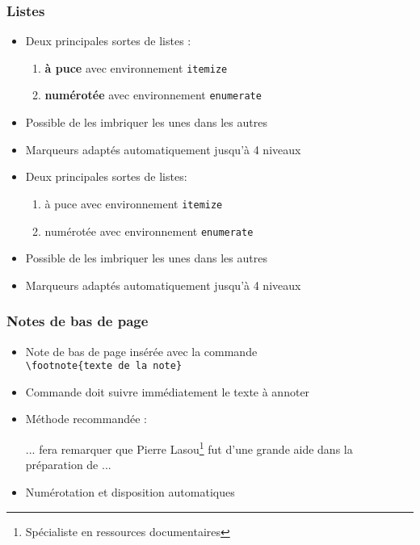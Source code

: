 \begin{frame}[fragile]

	\frametitle{Listes}
	
	\begin{itemize}
		\item Deux principales sortes de listes :
		\begin{enumerate}
			\item \textbf{à puce} avec environnement \texttt{itemize}
			\item \textbf{numérotée} avec environnement \texttt{enumerate}
		\end{enumerate}
		\item Possible de les imbriquer les unes dans les autres
		\item Marqueurs adaptés automatiquement jusqu'à 4 niveaux
	\end{itemize}

	\pause
	
	\begin{codesource}
	\begin{itemize}
		\item Deux principales sortes de listes:
		\begin{enumerate}
			\item à puce avec environnement \verb=itemize=
			\item numérotée avec environnement \verb=enumerate=
		\end{enumerate}
		\item Possible de les imbriquer les unes
			dans les autres
		\item Marqueurs adaptés automatiquement jusqu'à 4 niveaux
	\end{itemize}
	\end{codesource}

\end{frame}


\begin{frame}[fragile]

	\frametitle{Notes de bas de page}
	
	\begin{itemize}
		\item Note de bas de page insérée avec la commande \\
			\lstinline|\footnote{texte de la note}|
			
		\item Commande doit suivre immédiatement le texte à annoter
		
		\item Méthode recommandée : 
		\begin{codesource}
	... fera remarquer que Pierre Lasou\footnote{%
	Spécialiste en ressources documentaires} %
	fut d'une grande aide dans la préparation de ...
		\end{codesource}
				
		\item Numérotation et disposition automatiques
	\end{itemize}
\end{frame}

